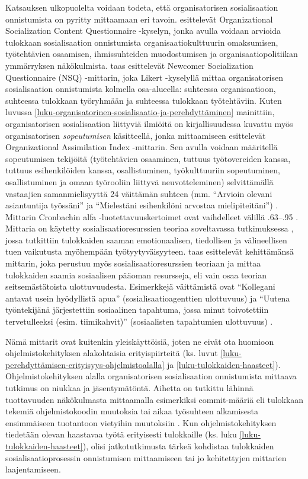 \documentclass[utf8]{gradu3}
\begin{document}
Katsauksen ulkopuolelta voidaan todeta, että organisatorisen sosialisaation onnistumista on pyritty mittaamaan eri tavoin. \textcite{zhao-ym-2007-mittari} esittelevät Organizational Socialization Content Questionnaire -kyselyn, jonka avulla voidaan arvioida tulokkaan sosialisaation onnistumista organisaatiokulttuurin omaksumisen, työtehtävien osaamisen, ihmissuhteiden muodostumisen ja organisaatiopolitiikan ymmärryksen näkökulmista. \textcite{haueter-ym-2003} taas esittelevät Newcomer Socialization Questionnaire (NSQ) -mittarin, joka Likert -kyselyllä mittaa organisatorisen sosialisaation onnistumista kolmella osa-alueella: suhteessa organisaatioon, suhteessa tulokkaan työryhmään ja suhteessa tulokkaan työtehtäviin. Kuten luvussa \ref{luku-organisatorinen-sosialisaatio-ja-perehdyttäminen} mainittiin, organisatorisen sosialisaation liittyviä ilmiöitä on kirjallisuudessa kuvattu myös organisatorisen \textit{sopeutumisen} käsitteellä, jonka mittaamiseen \textcite{gailliard-ym-2010} esittelevät Organizational Assimilation Index -mittarin. Sen avulla voidaan määritellä sopeutumisen tekijöitä (työtehtävien osaaminen, tuttuus työtovereiden kanssa, tuttuus esihenkilöiden kanssa, osallistuminen, työkulttuuriin sopeutuminen, osallistuminen ja omaan työrooliin liittyvä neuvotteleminen) selvittämällä vastaajien samanmielisyyttä 24 väittämän suhteen (mm. ``Arvioin olevani asiantuntija työssäni” ja “Mielestäni esihenkilöni arvostaa mielipiteitäni'') \parencite{gailliard-ym-2010}. Mittarin Cronbachin alfa -luotettavuuskertoimet ovat vaihdelleet välillä .63--.95 \parencite{gailliard-ym-2010}. Mittaria on käytetty sosialisaatioresurssien teoriaa soveltavassa tutkimuksessa \parencite{cranmer-ym-2016}, jossa tutkittiin tulokkaiden saaman emotionaalisen, tiedollisen ja välineellisen tuen vaikutusta myöhempään työtyytyväisyyteen. \textcite{harris-ym-2022} taas esittelevät kehittämänsä mittarin, joka perustuu myös sosialisaatioresurssien teoriaan ja mittaa tulokkaiden saamia sosiaalisen pääoman resursseja, eli vain osaa teorian seitsemästätoista ulottuvuudesta. Esimerkkejä väittämistä ovat ``Kollegani antavat usein hyödyllistä apua'' (sosialisaatioagenttien ulottuvuus) ja  ``Uutena työntekijänä järjestettiin sosiaalinen tapahtuma, jossa minut toivotettiin tervetulleeksi (esim. tiimikahvit)'' (sosiaalisten tapahtumien ulottuvuus) \parencite{harris-ym-2022}.  

Nämä mittarit ovat kuitenkin yleiskäyttöisiä, joten ne eivät ota huomioon ohjelmistokehityksen alakohtaisia erityispiirteitä (ks. luvut \ref{luku-perehdyttämisen-erityisyys-ohjelmistoalalla} ja \ref{luku-tulokkaiden-haasteet}). Ohjelmistokehityksen alalla organisatorisen sosialisaation onnistumista mittaava tutkimus on niukkaa ja jäsentymätöntä. Aihetta on tutkittu lähinnä tuottavuuden näkökulmasta mittaamalla esimerkiksi commit-määriä eli tulokkaan tekemiä ohjelmistokoodin muutoksia tai aikaa työsuhteen alkamisesta ensimmäiseen tuotantoon vietyihin muutoksiin \parencites%
    {rastogi-ym-2017}%
    {fagerholm-ym-2013}%
\relax.
% 
Kun ohjelmistokehityksen tiedetään olevan haastavaa työtä erityisesti tulokkaille (ks. luku \ref{luku-tulokkaiden-haasteet}), olisi jatkotutkimusta tärkeä kohdistaa tulokkaiden sosialisaatioprosessin onnistumisen mittaamiseen tai jo kehitettyjen mittarien laajentamiseen.
\end{document}
